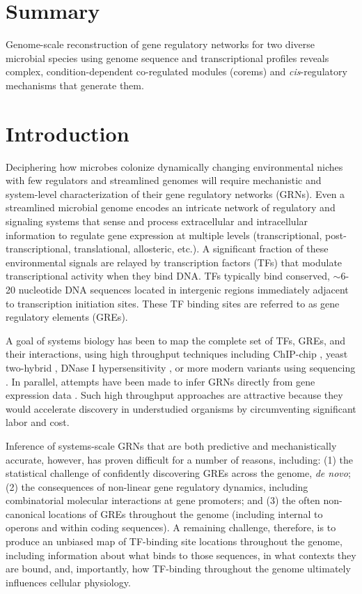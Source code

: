 \section{Summary}
 
Genome-scale reconstruction of gene regulatory networks for two diverse microbial species using genome sequence and transcriptional profiles reveals complex, condition-dependent co-regulated modules (corems) and \textit{cis}-regulatory mechanisms that generate them. 

\section{Introduction}

Deciphering how microbes colonize dynamically changing environmental niches with few regulators and streamlined genomes will require mechanistic and system-level characterization of their gene regulatory networks (GRNs). Even a streamlined microbial genome encodes an intricate network of regulatory and signaling systems that sense and process extracellular and intracellular information to regulate gene expression at multiple levels (transcriptional, post-transcriptional, translational, allosteric, etc.). A significant fraction of these environmental signals are relayed by transcription factors (TFs) that modulate transcriptional activity when they bind DNA. TFs typically bind conserved, $\sim$6-20 nucleotide DNA sequences located in intergenic regions immediately adjacent to transcription initiation sites. These TF binding sites are referred to as gene regulatory elements (GREs). 

A goal of systems biology has been to map the complete set of TFs, GREs, and their interactions, using high throughput techniques including ChIP-chip \cite{blat_cohesins_1999}, yeast two-hybrid \cite{fields_novel_1989}, DNase I hypersensitivity \cite{crawford_identifying_2004}, or more modern variants using sequencing \cite{johnson_genome-wide_2007}. In parallel, attempts have been made to infer GRNs directly from gene expression data \cite{bonneau_predictive_2007,de_smet_advantages_2010,faith_large-scale_2007,segal_genome-wide_2003}. Such high throughput approaches are attractive because they would accelerate discovery in understudied organisms by circumventing significant labor and cost.

Inference of systems-scale GRNs that are both predictive and mechanistically accurate, however, has proven difficult for a number of reasons, including: (1) the statistical challenge of confidently discovering GREs across the genome, \textit{de novo}; (2) the consequences of non-linear gene regulatory dynamics, including combinatorial molecular interactions at gene promoters; and (3) the often non-canonical locations of GREs throughout the genome (including internal to operons and within coding sequences). A remaining challenge, therefore, is to produce an unbiased map of TF-binding site locations throughout the genome, including information about what binds to those sequences, in what contexts they are bound, and, importantly, how TF-binding throughout the genome ultimately influences cellular physiology.     

